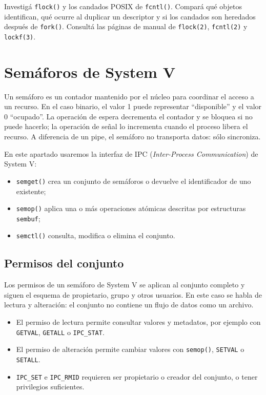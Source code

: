 \documentclass[11pt,a4paper]{article}
\begin{document}
\begin{extrabox}
Investigá \texttt{flock()} y los candados POSIX de \texttt{fcntl()}. Compará
qué objetos identifican, qué ocurre al duplicar un descriptor y si los
candados son heredados después de \texttt{fork()}. Consultá las páginas de
manual de \texttt{flock(2)}, \texttt{fcntl(2)} y \texttt{lockf(3)}.
\end{extrabox}

\section{Semáforos de System V}

Un semáforo es un contador mantenido por el núcleo para coordinar el acceso a
un recurso. En el caso binario, el valor 1 puede representar ``disponible'' y
el valor 0 ``ocupado''. La operación de espera decrementa el contador y se
bloquea si no puede hacerlo; la operación de señal lo incrementa cuando el
proceso libera el recurso. A diferencia de un pipe, el semáforo no transporta
datos: sólo sincroniza.

En este apartado usaremos la interfaz de IPC (\emph{Inter-Process
Communication}) de System V:

\begin{itemize}
  \item \texttt{semget()} crea un conjunto de semáforos o devuelve el
  identificador de uno existente;
  \item \texttt{semop()} aplica una o más operaciones atómicas descritas por
  estructuras \texttt{sembuf};
  \item \texttt{semctl()} consulta, modifica o elimina el conjunto.
\end{itemize}

\subsection{Permisos del conjunto}

Los permisos de un semáforo de System V se aplican al conjunto completo y
siguen el esquema de propietario, grupo y otros usuarios. En este caso se
habla de lectura y alteración: el conjunto no contiene un flujo de datos como
un archivo.

\begin{itemize}
  \item El permiso de lectura permite consultar valores y metadatos, por
  ejemplo con \texttt{GETVAL}, \texttt{GETALL} o \texttt{IPC\_STAT}.
  \item El permiso de alteración permite cambiar valores con \texttt{semop()},
  \texttt{SETVAL} o \texttt{SETALL}.
  \item \texttt{IPC\_SET} e \texttt{IPC\_RMID} requieren ser propietario o
  creador del conjunto, o tener privilegios suficientes.
\end{itemize}
\end{document}

